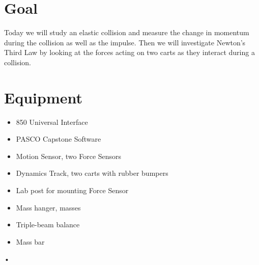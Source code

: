 \documentclass[main.tex]{subfiles}
\begin{document}
\section*{Goal}
Today we will study an elastic collision and measure the change in momentum during the collision as well as the impulse. Then we will investigate Newton's Third Law by looking at the forces acting on two carts as they interact during a collision.

\section*{Equipment}
\begin{itemize}
\item
850 Universal Interface
\item
PASCO Capstone Software
\item
Motion Sensor, two Force Sensors
\item
Dynamics Track, two carts with rubber bumpers
\item
Lab post for mounting Force Sensor
\item
Mass hanger, masses
\item
Triple-beam balance
\item
Mass bar
\end{itemize}•
\end{document}
